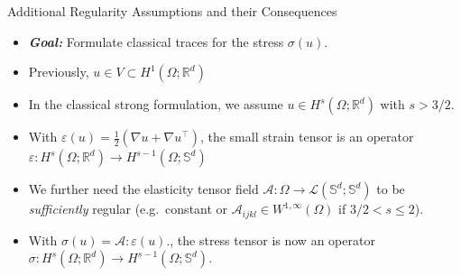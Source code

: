 \documentclass[10pt,aspectratio=169]{beamer}
\def\R{{\mathbb R}}
\def\S{{\mathbb S}}
\def\cA{{\mathcal A}}
\def\cL{{\mathcal L}}
\begin{document}
\begin{frame}{Additional Regularity Assumptions and their Consequences}
	\begin{itemize}
		\item \textbf{\em Goal:} Formulate classical traces for the stress $\sigma(u)$.
		\item Previously, $u\in V\subset H^1(\Omega;\R^d)$
		\item In the classical strong formulation, we assume $u\in H^s(\Omega;\R^d)$ with $s>3/2$.
		\item With $ \varepsilon(u)= \tfrac{1}{2}\left(\nabla u + \nabla u^\top\right)$, the small strain tensor is an operator $\varepsilon: H^s(\Omega;\R^d)\to H^{s-1}(\Omega;\S^d)$
		\item We further need the elasticity tensor field $\cA:\Omega\to\cL(\S^d;\S^d)$ to be {\em sufficiently} regular (e.g.\ constant or $\cA_{ijkl}\in W^{1,\infty}(\Omega)$ if $3/2<s\le 2$).
		\item With $\sigma(u) = \cA : \varepsilon(u)$., the stress tensor is now an operator $\sigma: H^s(\Omega;\R^d)\to H^{s-1}(\Omega;\S^d)$.
	\end{itemize}
\end{frame}
\end{document}
